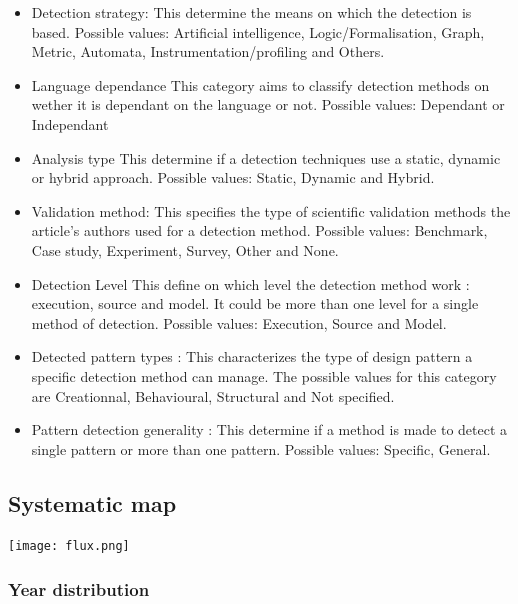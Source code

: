 \documentclass[letterpaper, 10 pt, conference]{ieeeconf}  %
\begin{document}
\begin{itemize}
  \item Detection strategy:
    This determine the means on which the detection is based.
    Possible values: Artificial intelligence, Logic/Formalisation, Graph,
    Metric, Automata, Instrumentation/profiling and Others.

  \item Language dependance
    This category aims to classify detection methods on wether it is dependant
    on the language or not. 
    Possible values: Dependant or Independant

  \item Analysis type
    This determine if a detection techniques use a static, dynamic or hybrid
    approach.
    Possible values: Static, Dynamic and Hybrid.

  \item Validation method:
    This specifies the type of scientific validation methods the article's 
    authors used for a detection method.
    Possible values: Benchmark, Case study, Experiment, Survey, Other and
    None.
    
  \item{Detection Level}
    This define on which level the detection method work : execution, source
    and model.
    It could be more than one level for a single method of detection.
    Possible values: Execution, Source and Model.

  \item Detected pattern types :
    This characterizes the type of design pattern a specific detection method
    can manage.
    The possible values for this category are Creationnal, Behavioural,
    Structural and Not specified.

  \item Pattern detection generality :
    This determine if a method is made to detect a single pattern or more than
    one pattern.
    Possible values: Specific, General.
\end{itemize}

\subsection{Systematic map}

\texttt{[image: flux.png]}


\subsubsection{Year distribution}
\end{document}
